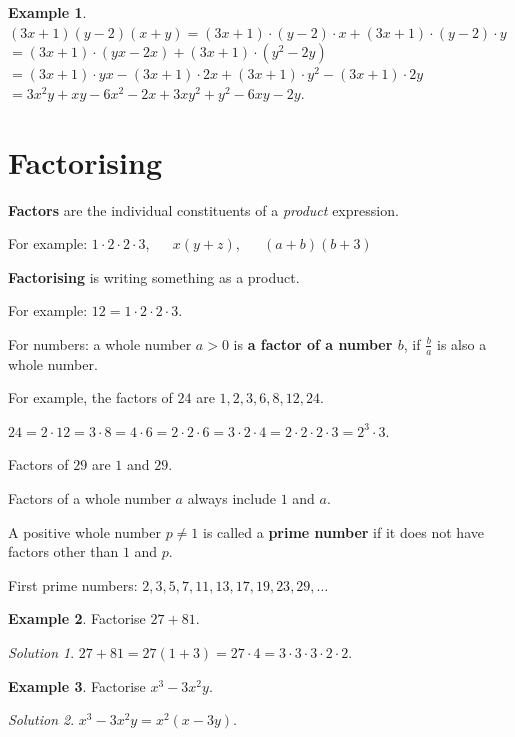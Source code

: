 \documentclass[
  12pt,
  oneside]{book}
\theoremstyle{definition}
\theoremstyle{definition}
\newtheorem{example}{Example}[chapter]
\theoremstyle{definition}
\theoremstyle{definition}
\theoremstyle{remark}
\newtheorem*{solution}{Solution}
\begin{document}
\begin{example}
\((3x+1)(y-2)(x+y)=(3x+1)\cdot(y-2)\cdot x + (3x+1)\cdot(y-2)\cdot y\) \(=(3x+1)\cdot(yx-2x) + (3x+1)\cdot(y^2-2y)\) \(= (3x+1)\cdot yx - (3x+1)\cdot 2x + (3x+1)\cdot y^2 - (3x+1)\cdot 2y\) \(= 3x^2y + xy - 6x^2 - 2x + 3xy^2 + y^2 - 6xy - 2y\).
\end{example}

\hypertarget{factorising-1}{%
\section{Factorising}\label{factorising-1}}

\textbf{Factors} are the individual constituents of a \emph{product} expression.

For example: \(1\cdot 2\cdot 2\cdot 3\), ~~ \(x(y+z)\), ~~ \((a+b)(b+3)\)

\textbf{Factorising} is writing something as a product.

For example: \(12 = 1\cdot 2\cdot 2\cdot 3\).

For numbers: a whole number \(a>0\) is \textbf{a factor of a number \(b\)}, if \(\frac{b}{a}\) is also a whole number.

For example, the factors of \(24\) are \(1,2,3,6,8,12,24\).

\(24 = 2\cdot 12 = 3\cdot 8 = 4\cdot 6 = 2\cdot 2\cdot 6 = 3\cdot2\cdot 4 = 2\cdot 2\cdot 2\cdot 3 = 2^3\cdot 3\).

Factors of \(29\) are \(1\) and \(29\).

Factors of a whole number \(a\) always include \(1\) and \(a\).

A positive whole number \(p\neq1\) is called a \textbf{prime number} if it does not have factors other than \(1\) and \(p\).

First prime numbers: \(2,3,5,7,11,13,17,19,23,29,\dots\)

\begin{example}
Factorise \(27+81\).
\end{example}

\begin{solution}
\(27+81 = 27(1+3)=27\cdot 4 = 3\cdot3\cdot3\cdot2\cdot2\).
\end{solution}

\begin{example}
Factorise \(x^3-3x^2y\).
\end{example}

\begin{solution}
\(x^3-3x^2y = x^2(x-3y)\).
\end{solution}
\end{document}
